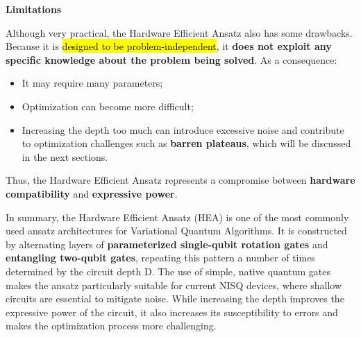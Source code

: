 \highspace
\begin{flushleft}
    \textcolor{Red2}{ \textbf{Limitations}}
\end{flushleft}
Although very practical, the Hardware Efficient Ansatz also has some drawbacks. Because it is \hl{designed to be problem-independent}, it \textbf{does not exploit any specific knowledge about the problem being solved}. As a consequence:
\begin{itemize}
    \item[\textcolor{Red2}{\faIcon{times}}] It may require many parameters;
    \item[\textcolor{Red2}{\faIcon{times}}] Optimization can become more difficult;
    \item[\textcolor{Red2}{\faIcon{times}}] Increasing the depth too much can introduce excessive noise and contribute to optimization challenges such as \textbf{barren plateaus}, which will be discussed in the next sections.
\end{itemize}
Thus, the Hardware Efficient Ansatz represents a compromise between \textbf{hardware compatibility} and \textbf{expressive power}.

\highspace
In summary, the Hardware Efficient Ansatz (HEA) is one of the most commonly used ansatz architectures for Variational Quantum Algorithms. It is constructed by alternating layers of \textbf{parameterized single-qubit rotation gates} and \textbf{entangling two-qubit gates}, repeating this pattern a number of times determined by the circuit depth D. The use of simple, native quantum gates makes the ansatz particularly suitable for current NISQ devices, where shallow circuits are essential to mitigate noise. While increasing the depth improves the expressive power of the circuit, it also increases its susceptibility to errors and makes the optimization process more challenging.
